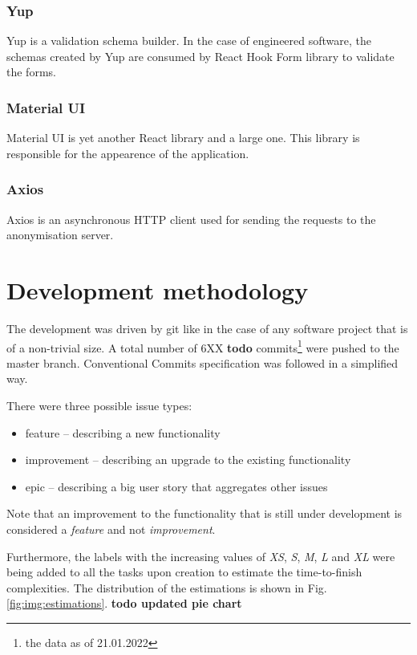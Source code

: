 \documentclass[a4paper,twoside,12pt]{book}
\begin{document}
\subsubsection{Yup}

Yup is a validation schema builder. In the case of engineered software, the schemas created by Yup are consumed by React Hook Form library to validate the forms.

\subsubsection{Material UI}

Material UI is yet another React library and a large one. This library is responsible for the appearence of the application.

\subsubsection{Axios}

Axios is an asynchronous HTTP client used for sending the requests to the anonymisation server.

\section{Development methodology}

The development was driven by git like in the case of any software project that is of a non-trivial size. A total number of 6XX \textbf{todo} commits\footnote{the data as of 21.01.2022} were pushed to the master branch. Conventional Commits specification was followed in a simplified way.

There were three possible issue types:
\begin{itemize}
\item feature – describing a new functionality
\item improvement – describing an upgrade to the existing functionality
\item epic – describing a big user story that aggregates other issues\cite{bib:agile_essentials}
\end{itemize}

Note that an improvement to the functionality that is still under development is considered a \textit{feature} and not \textit{improvement}.

Furthermore, the labels with the increasing values of \textit{XS}, \textit{S}, \textit{M}, \textit{L} and \textit{XL} were being added to all the tasks upon creation to estimate the time-to-finish complexities. The distribution of the estimations is shown in Fig. \ref{fig:img:estimations}. \textbf{todo updated pie chart}
\end{document}
